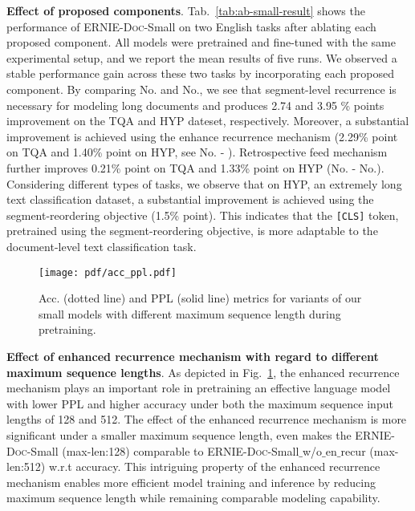 \documentclass[11pt,a4paper]{article}
\newcommand{\mname}{\textsc{ERNIE-Doc}\xspace}
\begin{document}
\noindent\textbf{Effect of proposed components}. Tab.~\ref{tab:ab-small-result} shows the performance of \mname-Small on two English tasks after ablating each proposed component. All models were pretrained and fine-tuned with the same experimental setup, and we report the mean results of five runs. We observed a stable performance gain across these two tasks by incorporating each proposed component. By comparing No.\uppercase\expandafter{} and No.\uppercase\expandafter{}, we see that segment-level recurrence is necessary for modeling long documents and produces 2.74 and 3.95 \% points improvement on the TQA and HYP dateset, respectively. Moreover, a substantial improvement is achieved using the enhance recurrence mechanism (2.29\% point on TQA and 1.40\% point on HYP, see No.\uppercase\expandafter{} - \uppercase\expandafter{}). Retrospective feed mechanism further improves 0.21\% point on TQA and 1.33\% point on HYP (No.\uppercase\expandafter{} - No.\uppercase\expandafter{}). Considering different types of tasks, we observe that on HYP, an extremely long text classification dataset, a substantial improvement is achieved using the segment-reordering objective (1.5\% point). This indicates that the \texttt{[CLS]} token, pretrained using the segment-reordering objective, is more adaptable to the document-level text classification task.
\begin{figure}[H]
\centering
\texttt{[image: pdf/acc\_ppl.pdf]}
\vspace{-1cm}
\caption{Acc. (dotted line) and PPL (solid line) metrics for variants of our small models with different maximum sequence length during pretraining.}
\label{fig:small_acc_ppl}
\vspace{-0.5cm}
\end{figure}

\noindent\textbf{Effect of enhanced recurrence mechanism with regard to different maximum sequence lengths}. As depicted in Fig.~\ref{fig:small_acc_ppl}, the enhanced recurrence mechanism plays an important role in pretraining an effective language model with lower PPL and higher accuracy under both the maximum sequence input lengths of 128 and 512. 
The effect of the enhanced recurrence mechanism is more significant under a smaller maximum sequence length, even makes the \mname-Small (max-len:128) comparable to \mname-Small$\_$w/o$\_$en$\_$recur (max-len:512) w.r.t accuracy. This intriguing property of the enhanced recurrence mechanism enables more efficient model training and inference by reducing maximum sequence length while remaining comparable modeling capability.
\end{document}
